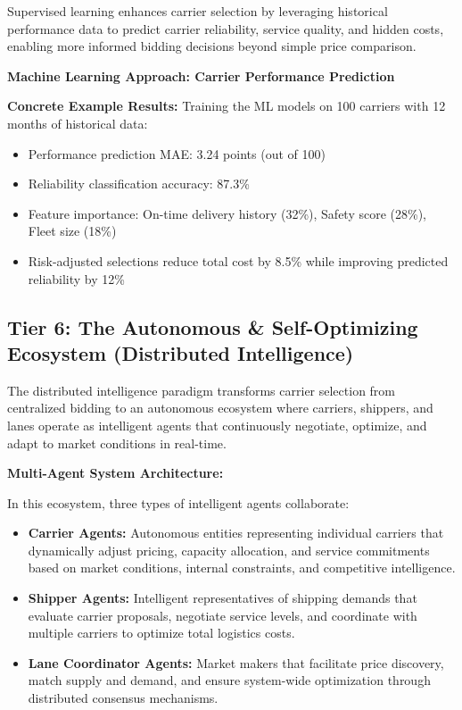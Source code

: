 \documentclass{article}
\begin{document}
Supervised learning enhances carrier selection by leveraging historical performance data to predict carrier reliability, service quality, and hidden costs, enabling more informed bidding decisions beyond simple price comparison.

\textbf{Machine Learning Approach: Carrier Performance Prediction}



\textbf{Concrete Example Results:}
Training the ML models on 100 carriers with 12 months of historical data:
\begin{itemize}
\item Performance prediction MAE: 3.24 points (out of 100)
\item Reliability classification accuracy: 87.3\%
\item Feature importance: On-time delivery history (32\%), Safety score (28\%), Fleet size (18\%)
\item Risk-adjusted selections reduce total cost by 8.5\% while improving predicted reliability by 12\%
\end{itemize}

\subsection{Tier 6: The Autonomous \& Self-Optimizing Ecosystem (Distributed Intelligence)}

The distributed intelligence paradigm transforms carrier selection from centralized bidding to an autonomous ecosystem where carriers, shippers, and lanes operate as intelligent agents that continuously negotiate, optimize, and adapt to market conditions in real-time.

\textbf{Multi-Agent System Architecture:}

In this ecosystem, three types of intelligent agents collaborate:
\begin{itemize}
\item \textbf{Carrier Agents:} Autonomous entities representing individual carriers that dynamically adjust pricing, capacity allocation, and service commitments based on market conditions, internal constraints, and competitive intelligence.
\item \textbf{Shipper Agents:} Intelligent representatives of shipping demands that evaluate carrier proposals, negotiate service levels, and coordinate with multiple carriers to optimize total logistics costs.
\item \textbf{Lane Coordinator Agents:} Market makers that facilitate price discovery, match supply and demand, and ensure system-wide optimization through distributed consensus mechanisms.
\end{itemize}
\end{document}

